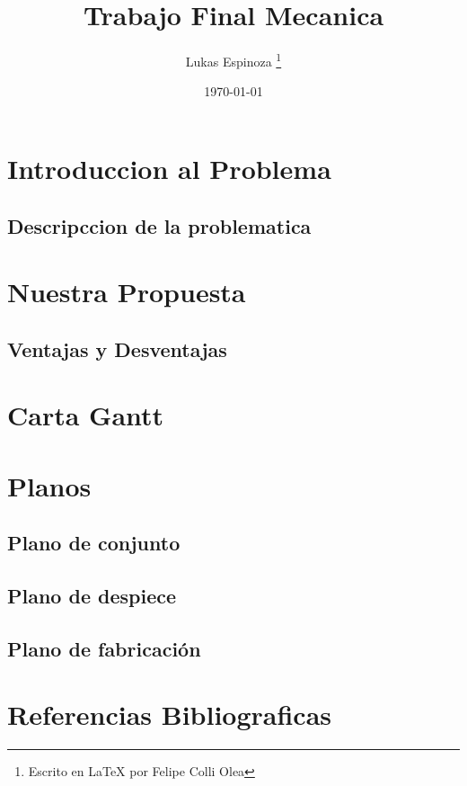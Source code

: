 \documentclass[11pt]{article}
\title{Trabajo Final Mecanica}
\author{Lukas Espinoza \thanks{Escrito en LaTeX por Felipe Colli Olea}}
\date{\today}
\begin{document}
\maketitle
\newpage
\tableofcontents


\section{Introduccion al Problema}
\subsection{Descripccion de la problematica}
\newpage


\section{Nuestra Propuesta}
\subsection{Ventajas y Desventajas}
\newpage


\section{Carta Gantt}
\section{Planos}
    \subsection{Plano de conjunto}
    \subsection{Plano de despiece}
    \subsection{Plano de fabricación}
    \newpage


\section{Referencias Bibliograficas}
\end{document}
